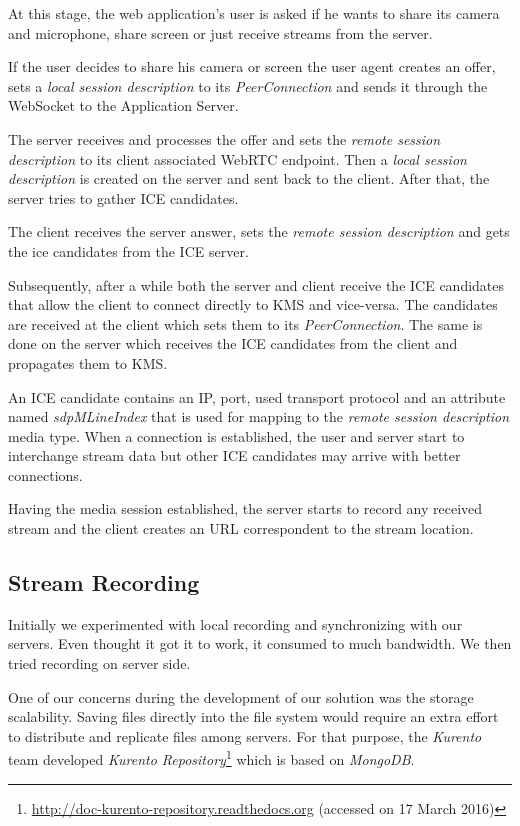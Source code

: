 \documentclass[conference,compsoc,a4paper]{IEEEtran}
\begin{document}
At this stage, the web application's user is asked if he wants to share its camera and microphone, share screen or just receive streams from the server. 

If the user decides to share his camera or screen the user agent creates an offer, sets a \emph{local session description} to its \emph{PeerConnection} and sends it through the WebSocket to the Application Server.

The server receives and processes the offer and sets the \emph{remote session description} to its client associated \gls{WebRTC} endpoint. Then a \emph{local session description} is created on the server and sent back to the client. After that, the server tries to gather \gls{ICE} candidates.

The client receives the server answer, sets the \emph{remote session description} and gets the ice candidates from the \gls{ICE} server.

Subsequently, after a while both the server and client receive the \gls{ICE} candidates that allow the client to connect directly to \gls{KMS} and vice-versa. The candidates are received at the client which sets them to its \emph{PeerConnection}. The same is done on the server which receives the \gls{ICE} candidates from the client and propagates them to \gls{KMS}.


An \gls{ICE} candidate contains an \gls{IP}, port, used transport protocol and an attribute named \emph{sdpMLineIndex} that is used for mapping to the \emph{remote session description} media type.
When a connection is established, the user and server start to interchange stream data but other \gls{ICE} candidates may arrive with better connections.

Having the media session established, the server starts to record any received stream and the client creates an \gls{URL} correspondent to the stream location.

\subsection{Stream Recording}
 Initially we experimented with local recording and synchronizing with our servers. Even thought it got it to work, it consumed to much bandwidth. We then tried recording on server side.

	One of our concerns during the development of our solution was the storage scalability. Saving files directly into the file system would require an extra effort to distribute and replicate files among servers. For that purpose, the \emph{Kurento} team developed \emph{Kurento Repository}\footnote{\url{http://doc-kurento-repository.readthedocs.org} (accessed on 17 March 2016)} which is based on \emph{MongoDB}.
\end{document}
